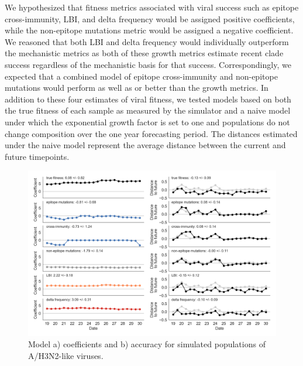 We hypothesized that fitness metrics associated with viral success such as epitope cross-immunity, LBI, and delta frequency would be assigned positive coefficients, while the non-epitope mutations metric would be assigned a negative coefficient.
We reasoned that both LBI and delta frequency would individually outperform the mechanistic metrics as both of these growth metrics estimate recent clade success regardless of the mechanistic basis for that success.
Correspondingly, we expected that a combined model of epitope cross-immunity and non-epitope mutations would perform as well as or better than the growth metrics.
In addition to these four estimates of viral fitness, we tested models based on both the true fitness of each sample as measured by the simulator and a naive model under which the exponential growth factor is set to one and populations do not change composition over the one year forecasting period.
The distances estimated under the naive model represent the average distance between the current and future timepoints.

\begin{figure}[t]
  \begin{center}
  \includegraphics[width=\textwidth]{figures/unadjusted-model-accuracy-and-coefficients-for-simulated-populations.png}
  \caption{Model a) coefficients and b) accuracy for simulated populations of A/H3N2-like viruses.}
  \label{fig:unadjusted_model_accuracy_and_coefficients_for_simulated_populations}
  \end{center}
\end{figure}

